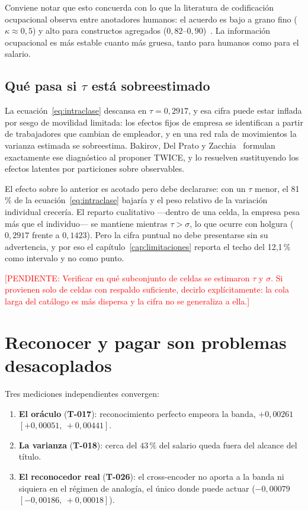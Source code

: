 \documentclass[12pt,a4paper,oneside]{report}
\newcommand{\pend}[1]{\textcolor{red}{\small[PENDIENTE: #1]}}
\newcommand{\tref}[1]{\textbf{T-#1}}
\begin{document}
Conviene notar que esto concuerda con lo que la literatura de codificación ocupacional
observa entre anotadores humanos: el acuerdo es bajo a grano fino
($\kappa \approx 0{,}5$) y alto para constructos agregados
($0{,}82$--$0{,}90$)~\cite{massing2019}. La información ocupacional es más estable cuanto
más gruesa, tanto para humanos como para el salario.

\subsection{Qué pasa si \texorpdfstring{$\tau$}{tau} está sobreestimado}

La ecuación~\eqref{eq:intraclase} descansa en $\tau = 0{,}2917$, y esa cifra puede estar
inflada por sesgo de movilidad limitada: los efectos fijos de empresa se identifican a
partir de trabajadores que cambian de empleador, y en una red rala de movimientos la
varianza estimada se sobreestima. Bakirov, Del Prato y Zacchia~\cite{twice2026} formulan
exactamente ese diagnóstico al proponer TWICE, y lo resuelven sustituyendo los efectos
latentes por particiones sobre observables.

El efecto sobre lo anterior es acotado pero debe declararse: con un $\tau$ menor, el
81\,\% de la ecuación~\eqref{eq:intraclase} bajaría y el peso relativo de la variación
individual crecería. El reparto cualitativo —dentro de una celda, la empresa pesa más que
el individuo— se mantiene mientras $\tau > \sigma$, lo que ocurre con holgura
($0{,}2917$ frente a $0{,}1423$). Pero la cifra puntual no debe presentarse sin su
advertencia, y por eso el capítulo~\ref{cap:limitaciones} reporta el techo del 12,1\,\%
como intervalo y no como punto.

\pend{Verificar en qué subconjunto de celdas se estimaron $\tau$ y $\sigma$. Si provienen
solo de celdas con respaldo suficiente, decirlo explícitamente: la cola larga del catálogo
es más dispersa y la cifra no se generaliza a ella.}

\section{Reconocer y pagar son problemas desacoplados}

Tres mediciones independientes convergen:

\begin{enumerate}[leftmargin=2em]
  \item \textbf{El oráculo} (\tref{017}): reconocimiento perfecto empeora la banda,
    $+0{,}00261$ $[+0{,}00051,\ +0{,}00441]$.
  \item \textbf{La varianza} (\tref{018}): cerca del $43\,\%$ del salario queda fuera del
    alcance del título.
  \item \textbf{El reconocedor real} (\tref{026}): el cross-encoder no aporta a la banda ni
    siquiera en el régimen de analogía, el único donde puede actuar
    ($-0{,}00079$ $[-0{,}00186,\ +0{,}00018]$).
\end{enumerate}
\end{document}

